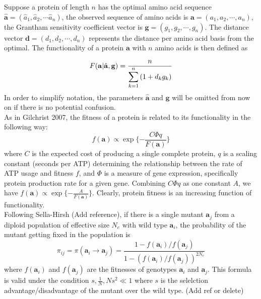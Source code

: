 \documentclass[13pt]{article}
\begin{document}
Suppose a protein of length $n$ has the optimal amino acid sequence $\hat{\mathbf{a}} = (\hat{a}_1, \hat{a}_2, \cdots \hat{a}_n)$, the observed sequence of amino acids is $\mathbf{a} = (a_1, a_2, \cdots, a_n)$, the Grantham sensitivity coefficient vector is  $\mathbf{g}=(g_1,g_2,\cdots,g_n)$.
The distance vector $\mathbf{d} = (d_1, d_2, \cdots, d_n)$ represents the distance per amino acid basis from the optimal. The functionality of a protein $\mathbf{a}$ with $n$ amino acids is then defined as

\begin{equation}
F(\mathbf{a}| \hat{\mathbf{a}},\mathbf{g})  =  \frac{n}{\displaystyle  \sum_{k=1}^n{(1+d_kg_k)}} \label{eq:harmonic}\\
\end{equation}
In order to simplify notation, the parameters $\hat{\mathbf{a}}$ and $\mathbf{g}$ will be omitted from now on if there is no potential confusion.\\

As in Gilchrist 2007, the fitness of a protein is related to its functionality in the following way:
\[f(\mathbf{a}) \propto \exp\{-\frac{C\Phi q}{F(\mathbf{a})}\}\]
where $C$ is the expected cost of producing a single complete protein, $q$ is a scaling constant (seconds per ATP) determining the relationship between the rate of ATP usage and fitness $f$, and $\Phi$ is a measure of gene expression, specifically protein production rate for a given gene.
Combining $C\Phi q$ as one constant $A$, we have
$f(\mathbf{a}) \propto \exp\{-\frac{A}{F(\mathbf{a})}\}$.
Clearly, protein fitness is an increasing function of functionality.\\

Following Sella-Hirsh (Add reference), if there is a single mutant $\mathbf{a}_j$ from a diploid population of effective size $N_e$ with wild type $\mathbf{a}_i$, the probability of the mutant getting fixed in the population is 
\begin{equation}
\pi_{ij} = \pi(\mathbf{a}_i \rightarrow \mathbf{a}_j ) = \frac{1-f(\mathbf{a}_i)/f(\mathbf{a}_j)}{1-(f(\mathbf{a}_i)/f(\mathbf{a}_j))^{2N_e}}
\label{eq:fixation}
\end{equation}
where $f(\mathbf{a}_i)$ and $f(\mathbf{a}_j)$ are the fitnesses of genotypes $\mathbf{a}_i$ and $\mathbf{a}_j$. This formula is valid under the condition $s, \frac{1}{N}, Ns^2 \ll 1$ where $s$ is the selelction advantage/disadvantage of the mutant over the wild type. (Add ref or delete)\\
\end{document}
